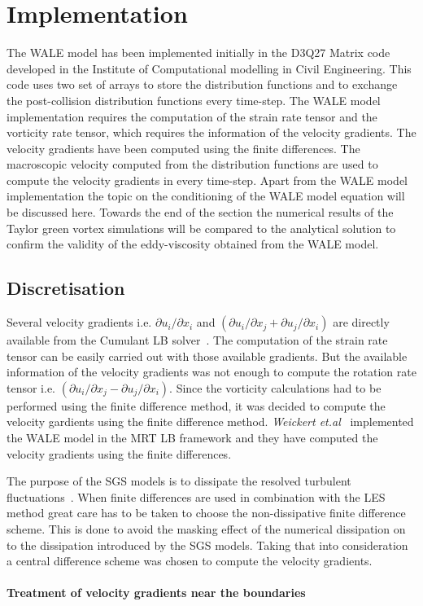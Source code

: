 \newpage

\section{Implementation}
The WALE model has been implemented initially in the D3Q27 Matrix code developed in the Institute of Computational modelling in Civil Engineering. This code uses two set of arrays to store the distribution functions and to exchange the post-collision distribution functions every time-step. The WALE model implementation requires the computation of the strain rate tensor and the vorticity rate tensor, which requires the information of the velocity gradients. The velocity gradients have been computed using the finite differences. The macroscopic velocity computed from the distribution functions are used to compute the velocity gradients in every time-step. Apart from the WALE model implementation the topic on the conditioning of the WALE model equation will be discussed here. Towards the end of the section the numerical results of the Taylor green vortex simulations will be compared to the analytical solution to confirm the validity of the eddy-viscosity obtained from the WALE model.

\subsection{Discretisation}
Several velocity gradients i.e. $\partial u_i/\partial x_i$ and $\left(\partial u_i/\partial x_j + \partial u_j/\partial x_i\right)$ are directly available from the Cumulant LB solver~\cite{geier:parameter}. The computation of the strain rate tensor can be easily carried out with those available gradients. But the available information of the velocity gradients was not enough to compute the rotation rate tensor i.e. $\left(\partial u_i/\partial x_j - \partial u_j/\partial x_i\right)$. Since the vorticity calculations had to be  performed using the finite difference method, it was decided to compute the velocity gardients using the finite difference method. \emph{Weickert et.al}~\cite{weickert:LES} implemented the WALE model in the MRT LB framework and they have computed the velocity gradients using the finite differences. 

The purpose of the SGS models is to dissipate the resolved turbulent fluctuations~\cite{davidson}. When finite differences are used in combination with the LES method great care has to be taken to choose the non-dissipative finite difference scheme. This is done to avoid the masking effect of the numerical dissipation on to the dissipation introduced by the SGS models. Taking that into consideration a central difference scheme was chosen to compute the velocity gradients.\\\\
%
\textbf{Treatment of velocity gradients near the boundaries}

